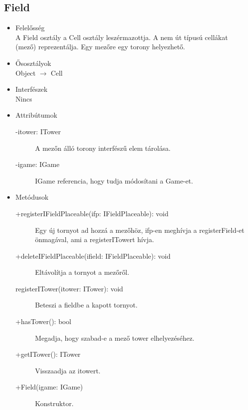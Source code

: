 \subsection{Field}
\begin{itemize}
\item Felelősség\\
A Field osztály a Cell osztály leszérmazottja. A nem út típusú cellákat (mező) reprezentálja. Egy mezőre egy torony helyezhető.
\item Ősosztályok\\
Object $\rightarrow$ Cell
\item Interfészek\\
Nincs
\item Attribútumok\\
	\begin{description}
		\item[-itower: ITower] A mezőn álló torony interfészű elem tárolása.  
		\item[-igame: IGame] IGame referencia, hogy tudja módosítani a Game-et. 

		
	\end{description}
\item Metódusok\\
	\begin{description}
		
		
		\item[+registerIFieldPlaceable(ifp: IFieldPlaceable): void] Egy új tornyot ad hozzá a mezőhöz, ifp-en meghívja a registerField-et önmagával, ami a registerITowert hívja. 
		\item[+deleteIFieldPlaceable(ifield: IFieldPlaceable): void] Eltávolítja a tornyot a mezőről. 
		\item[registerITower(itower: ITower): void] Beteszi a fieldbe a kapott tornyot. 
		\item[+hasTower(): bool] Megadja, hogy szabad-e a mező tower elhelyezéséhez. 
		\item[+getITower(): ITower] Visszaadja az itowert. 
		\item[+Field(igame: IGame)] Konstruktor. 
		
		
	\end{description}
\end{itemize}



